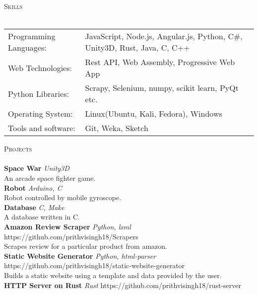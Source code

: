 \documentclass[a4paper]{article}
\newcommand{\lineunder} {
    \vspace*{-8pt} \\
    \hspace*{-18pt} \hrulefill \\
}
\newcommand{\header} [1] {
    {\hspace*{-18pt}\vspace*{6pt} \textsc{#1}}
    \vspace*{-6pt} \lineunder
}
\begin{document}
\header{Skills}
\begin{tabular}{ l l }
	Programming Languages: & JavaScript, Node.js, Angular.js, Python, C\#, Unity3D, Rust, Java, C, C++ \\
	Web Technologies:      & Rest API, Web Assembly, Progressive Web App                               \\
	Python Libraries:      & Scrapy, Selenium, numpy, scikit learn, PyQt etc.                          \\
	Operating System:      & Linux(Ubuntu, Kali, Fedora), Windows                                      \\
	Tools and software:    & Git, Weka, Sketch                                                         \\
\end{tabular}
\vspace{2mm}
\filbreak
\header{Projects}
{\textbf{Space War}} {\sl Unity3D} \\
An arcade space fighter game.\\
\vspace*{2mm}
{\textbf{Robot}} {\sl Arduino, C} \\
Robot controlled by mobile gyroscope.\\
\vspace*{2mm}
{\textbf{Database}} {\sl C, Make} \\
A database written in C.\\
\vspace*{2mm}
{\textbf{Amazon Review Scraper}} {\sl Python, lxml} \hfill https://github.com/prithvisingh18/Scrapers\\
Scrapes review for a particular product from amazon.\\
\vspace*{2mm}
{\textbf{Static Website Generator}} {\sl Python, html-parser} \hfill https://github.com/prithvisingh18/static-website-generator\\
Builds a static website using a template and data provided by the user.\\
\vspace*{2mm}
{\textbf{HTTP Server on Rust}} {\sl Rust} \hfill https://github.com/prithvisingh18/rust-server\\
\end{document}
